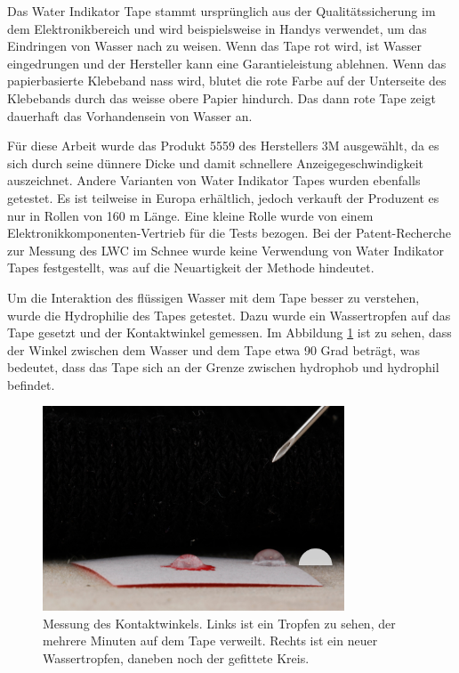 Das Water Indikator Tape stammt ursprünglich aus der Qualitätssicherung im dem Elektronikbereich und wird beispielsweise in Handys verwendet, um das Eindringen von Wasser nach zu weisen. Wenn das Tape rot wird, ist Wasser eingedrungen und der Hersteller kann eine Garantieleistung ablehnen. Wenn das papierbasierte Klebeband nass wird, blutet die rote Farbe auf der Unterseite des Klebebands durch das weisse obere Papier hindurch. Das dann rote Tape zeigt dauerhaft das Vorhandensein von Wasser an.

Für diese Arbeit wurde das Produkt 5559 des Herstellers 3M ausgewählt, da es sich durch seine dünnere Dicke und damit schnellere Anzeigegeschwindigkeit auszeichnet. Andere Varianten von Water Indikator Tapes wurden ebenfalls getestet. Es ist teilweise in Europa erhältlich, jedoch verkauft der Produzent es nur in Rollen von 160 m Länge. Eine kleine Rolle wurde von einem Elektronikkomponenten-Vertrieb für die Tests bezogen. Bei der Patent-Recherche zur Messung des LWC im Schnee wurde keine Verwendung von Water Indikator Tapes festgestellt, was auf die Neuartigkeit der Methode hindeutet.

Um die Interaktion des flüssigen Wasser mit dem Tape besser zu verstehen, wurde die Hydrophilie des Tapes getestet. Dazu wurde ein Wassertropfen auf das Tape gesetzt und der Kontaktwinkel gemessen. Im Abbildung \ref{fig:winkTropf} ist zu sehen, dass der Winkel zwischen dem Wasser und dem Tape etwa 90 Grad beträgt, was bedeutet, dass das Tape sich an der Grenze zwischen hydrophob und hydrophil befindet.

\begin{figure}
    \centering
    \includegraphics[width=0.8\textwidth]{Bilder/IMG_6683.JPG}
    \caption{Messung des Kontaktwinkels. Links ist ein Tropfen zu sehen, der mehrere Minuten auf dem Tape verweilt. Rechts ist ein neuer Wassertropfen, daneben noch der gefittete Kreis.} 
    \label{fig:winkTropf}
\end{figure}

